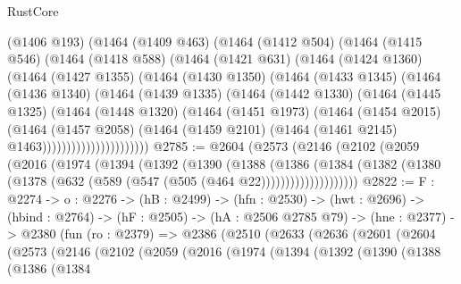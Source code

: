 \begin{lexlean}{RustCore}
\begin{coremodule}
          (@1406 @193)
          (@1464
            (@1409 @463)
            (@1464
              (@1412 @504)
              (@1464
                (@1415 @546)
                (@1464
                  (@1418 @588)
                  (@1464
                    (@1421 @631)
                    (@1464
                      (@1424 @1360)
                      (@1464
                        (@1427 @1355)
                        (@1464
                          (@1430 @1350)
                          (@1464
                            (@1433 @1345)
                            (@1464
                              (@1436 @1340)
                              (@1464
                                (@1439 @1335)
                                (@1464
                                  (@1442 @1330)
                                  (@1464
                                    (@1445 @1325)
                                    (@1464
                                      (@1448 @1320)
                                      (@1464
                                        (@1451 @1973)
                                        (@1464
                                          (@1454 @2015)
                                          (@1464
                                            (@1457 @2058)
                                            (@1464
                                              (@1459 @2101)
                                              (@1464 (@1461 @2145) @1463))))))))))))))))))))))
@2785 := @2604
    (@2573
      (@2146
        (@2102
          (@2059
            (@2016
              (@1974
                (@1394
                  (@1392
                    (@1390
                      (@1388
                        (@1386
                          (@1384
                            (@1382
                              (@1380 (@1378 (@632 (@589 (@547 (@505 (@464 @22))))))))))))))))))))
@2822 := {F : @2274} ->
  {o : @2276} ->
  (hB : @2499) ->
  (hfn : @2530) ->
  (hwt : @2696) ->
  (hbind : @2764) ->
  (hF : @2505) ->
  (hA : @2506 @2785 @79) ->
  (hne : @2377) ->
  @2380
    (fun (ro : @2379) =>
    @2386
      (@2510
        (@2633
          (@2636
            (@2601
              (@2604
                (@2573
                  (@2146
                    (@2102
                      (@2059
                        (@2016
                          (@1974
                            (@1394
                              (@1392
                                (@1390
                                  (@1388
                                    (@1386
                                      (@1384

\end{coremodule}
\end{lexlean}
